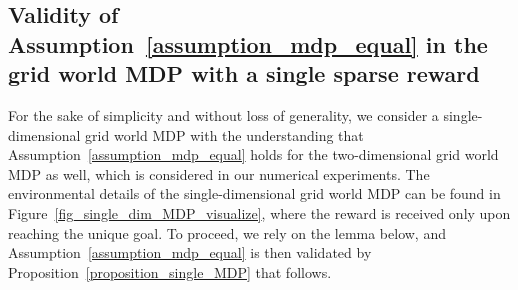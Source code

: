


\subsection{Validity of Assumption~\ref{assumption_mdp_equal} in the grid world MDP with a single sparse reward}
\label{appendix_validate_assump2}

For the sake of simplicity and without loss of generality, we consider a single-dimensional grid world MDP with the understanding that Assumption~\ref{assumption_mdp_equal} holds for the two-dimensional grid world MDP as well, which is considered in our numerical experiments. The environmental details of the single-dimensional grid world MDP can be found in Figure~\ref{fig_single_dim_MDP_visualize}, where the reward is received only upon reaching the unique goal.
%
To proceed, we rely on the lemma below, and Assumption~\ref{assumption_mdp_equal} is then validated by Proposition~\ref{proposition_single_MDP} that follows.
%


